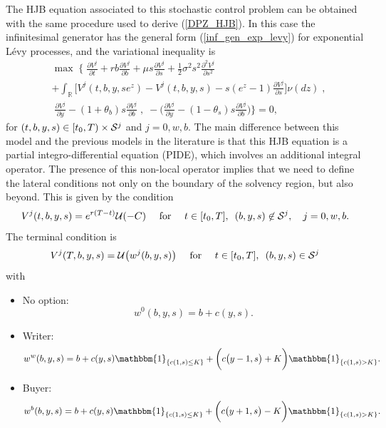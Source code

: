 The HJB equation associated to this stochastic control problem can be obtained with the same procedure used to derive (\ref{DPZ_HJB}). In this case the infinitesimal generator has the 
general form (\ref{inf_gen_exp_levy}) for exponential Lévy processes, and the variational inequality is
\begin{align}\label{HJB1}
& \max \; \biggl\{ \; \frac{\partial V^j}{\partial t} + rb\frac{\partial V^j}{\partial b} 
+ \mu s \frac{\partial V^j}{\partial s} + \frac{1}{2}\sigma^2 s^2 \frac{\partial^2 V^j}{\partial s^2} \\ \nonumber
&+ \int_\mathbb{R}
\biggl[ V^j(t,b,y,se^z) - V^j(t,b,y,s) - s(e^z-1)\frac{\partial V^j}{\partial s} \biggr] \nu(dz) \;,\\ \nonumber
& \;  \frac{\partial V^j}{\partial y}-(1+\theta_b) s \frac{\partial V^j}{\partial b} \; 
, \; -\biggl(\frac{\partial V^j}{\partial y}-(1-\theta_s)s \frac{\partial V^j}{\partial b} \biggr) \biggr\} = 0, 
 \end{align}
for $(t,b,y,s) \in [t_0,T) \times \mathcal{S}^j$ and $j=0,w,b$.   
The main difference between this model and the previous models in the literature is that this HJB equation is a
partial integro-differential equation (PIDE), which involves an additional integral operator.
The presence of this non-local operator implies that 
we need to define the lateral conditions not only on the boundary
of the solvency region, but also beyond.
This is given by the condition
\begin{equation}\label{lat_conditions}
V^j(t,b,y,s) = e^{r(T-t)} \mathcal{U}(-C) \hspace{1em} \mbox{ for } \hspace{1em} 
t \in [t_0,T] , \hspace{0.5em} (b,y,s) \not \in \mathcal{S}^j, \hspace{1em} j=0,w,b.
\end{equation}
The terminal condition is
\begin{equation}\label{terminal_conditions}
V^j(T,b,y,s) = \mathcal{U}\bigl( w^j(b,y,s) \bigr) \hspace{1em} \mbox{ for } \hspace{1em} 
t \in [t_0,T] , \hspace{0.5em} (b,y,s) \in \mathcal{S}^j 
\end{equation}
with
\begin{itemize}
  \item No option: 
  \begin{equation*}
   w^0(b,y,s) =  b + c(y,s).
  \end{equation*}
  \item Writer: 
  \begin{equation*}
   w^w(b,y,s) =  b + c(y,s) \mathbbm{1}_{\{ c(1,s) \leq K\}} +
  \biggl( c\bigl( y-1,s \bigr) + K \biggr) \mathbbm{1}_{\{c(1,s)>K\}}.
  \end{equation*}
  \item Buyer: 
  \begin{equation*}
   w^b(b,y,s) = b + c(y,s) \mathbbm{1}_{\{ c(1,s) \leq K\}} +
  \biggl( c\bigl( y+1,s \bigr) - K \biggr) \mathbbm{1}_{\{c(1,s)>K\}}.
  \end{equation*}
\end{itemize}
